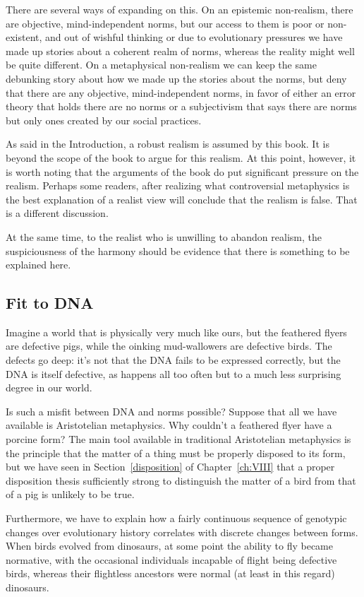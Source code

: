 There are several ways of expanding on this. On an epistemic non-realism, there are objective, mind-independent norms, but 
our access to them is poor or non-existent, and out of wishful thinking or due to evolutionary pressures we have made 
up stories about a coherent realm of norms, whereas the reality might well be quite different. On a metaphysical non-realism 
we can keep the same debunking story about how we made up the stories about the norms, but deny that there are any 
objective, mind-independent norms, in favor of either an error theory that holds there are no norms or a subjectivism
that says there are norms but only ones created by our social practices. 

As said in the Introduction, a robust realism is assumed by this book. It is beyond the scope of the book to argue for 
this realism. At this point, however, it is worth noting that the arguments of the book do put significant pressure 
on the realism. Perhaps some readers, after realizing what controversial metaphysics is the best explanation of a realist
view will conclude that the realism is false. That is a different discussion.

At the same time, to the realist who is unwilling to abandon realism, the suspiciousness of the harmony should be 
evidence that there is something to be explained here. 

\subsection{Fit to DNA}
Imagine a world that is physically very much like ours, but the feathered flyers are defective
pigs, while the oinking mud-wallowers are defective birds. The defects go deep: it's not that the DNA fails
to be expressed correctly, but the DNA is itself defective, as happens all too often but to a much less
surprising degree in our world.

Is such a misfit between DNA and norms possible? Suppose that all we have available is Aristotelian metaphysics.
Why couldn't a feathered flyer have a porcine form? The main tool available in traditional Aristotelian metaphysics
is the principle that the matter of a thing must be properly disposed to its form, but we have seen in Section~\ref{disposition}
of Chapter~\ref{ch:VIII} that a proper disposition thesis sufficiently strong to distinguish the matter of a bird from 
that of a pig is unlikely to be true. 

Furthermore, we have to explain how a fairly continuous sequence of genotypic changes over evolutionary history 
correlates with discrete changes between forms. When birds evolved from dinosaurs, at some point the ability to 
fly became normative, with the occasional individuals incapable of flight being defective birds, whereas their flightless 
ancestors were normal (at least in this regard) dinosaurs. 

